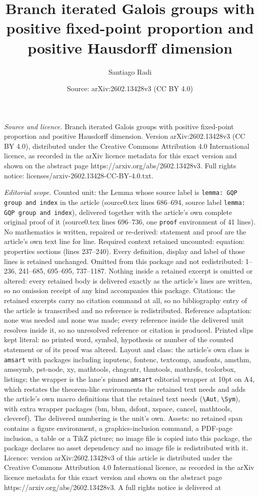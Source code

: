 \documentclass[10pt,a4paper]{amsart}
\title[Branch iterated Galois groups with positive fixed-point prop]{Branch iterated Galois groups with positive fixed-point proportion and positive Hausdorff dimension}
\author{Santiago Radi}
\date{Source: arXiv:2602.13428v3 (CC BY 4.0)}
\begin{document}
\maketitle

\noindent\emph{Source and licence.} Branch iterated Galois groups with positive fixed-point proportion and positive Hausdorff dimension. Version arXiv:2602.13428v3 (CC BY 4.0), distributed under the Creative Commons Attribution 4.0 International licence, as recorded in the arXiv licence metadata for this exact version and shown on the abstract page https://arxiv.org/abs/2602.13428v3. Full rights notice: licenses/arxiv-2602.13428-CC-BY-4.0.txt.\par\smallskip

\noindent\textit{Editorial scope.} Counted unit: the Lemma whose source label is \texttt{lemma: GQP group and index} in the article (source0.tex lines 686--694, source label \texttt{lemma: GQP group and index}), delivered together with the article's own complete original proof of it (source0.tex lines 696--736, one \texttt{proof} environment of 41 lines). No mathematics is written, repaired or re-derived: statement and proof are the article's own text line for line. Required context retained uncounted: equation: properties sections (lines 237--240). Every definition, display and label of those lines is retained unchanged. Omitted from this package and not redistributed: 1--236, 241--685, 695--695, 737--1187. Nothing inside a retained excerpt is omitted or altered: every retained body is delivered exactly as the article's lines are written, so no omission receipt of any kind accompanies this package. Citations: the retained excerpts carry no citation command at all, so no bibliography entry of the article is transcribed and no reference is redistributed. Reference adaptation: none was needed and none was made; every reference inside the delivered unit resolves inside it, so no unresolved reference or citation is produced. Printed slips kept literal: no printed word, symbol, hypothesis or number of the counted statement or of its proof was altered. Layout and class: the article's own class is \texttt{amsart} with packages including inputenc, fontenc, textcomp, amsfonts, amsthm, amssymb, pst-node, xy, mathtools, chngcntr, thmtools, mathrsfs, tcolorbox, listings; the wrapper is the lane's pinned \texttt{amsart} editorial wrapper at 10pt on A4, which restates the theorem-like environments the retained text needs and adds the article's own macro definitions that the retained text needs (\texttt{\textbackslash Aut}, \texttt{\textbackslash Sym}), with extra wrapper packages (bm, bbm, dsfont, xspace, cancel, mathtools, cleveref). The delivered numbering is the unit's own. Assets: no retained span contains a figure environment, a graphics-inclusion command, a PDF-page inclusion, a table or a TikZ picture; no image file is copied into this package, the package declares no asset dependency and no image file is redistributed with it. Licence: version arXiv:2602.13428v3 of this article is distributed under the Creative Commons Attribution 4.0 International licence, as recorded in the arXiv licence metadata for this exact version and shown on the abstract page https://arxiv.org/abs/2602.13428v3. A full rights notice is delivered at 
\end{document}
